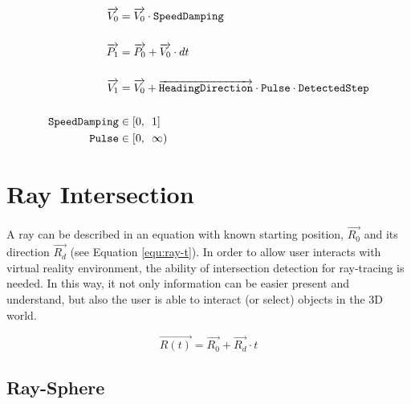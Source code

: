\[
\begin{array}{lr}
\begin{aligned}
\overrightarrow{V_0} &= \overrightarrow{V_0} \cdot \texttt{SpeedDamping}\\\\
\overrightarrow{P_1} &= \overrightarrow{P_0} + \overrightarrow{V_0} \cdot dt\\\\
\overrightarrow{V_1} &= \overrightarrow{V_0} + \overrightarrow{\texttt{HeadingDirection}} \cdot \texttt{Pulse} \cdot \texttt{DetectedStep}\\\\
\texttt{SpeedDamping} &\in [0,\enspace 1]\\
\texttt{Pulse} &\in [0,\enspace \infty)\\
\end{aligned}
\end{array}
\]

\section{Ray Intersection}

A ray can be described in an equation with known starting position, $\overrightarrow{R_0}$ and its direction $\overrightarrow{R_d}$ (see Equation \ref{equ:ray-t}). In order to allow user interacts with virtual reality environment, the ability of intersection detection for ray-tracing is needed. In this way, it not only information can be easier present and understand, but also the user is able to interact (or select) objects in the 3D world. 

\begin{equation}
\label{equ:ray-t}
\overrightarrow{R(t)} = \overrightarrow{R_0} + \overrightarrow{R_d} \cdot t
\end{equation}

\subsection{Ray-Sphere}
\label{section:ray-sphere}

